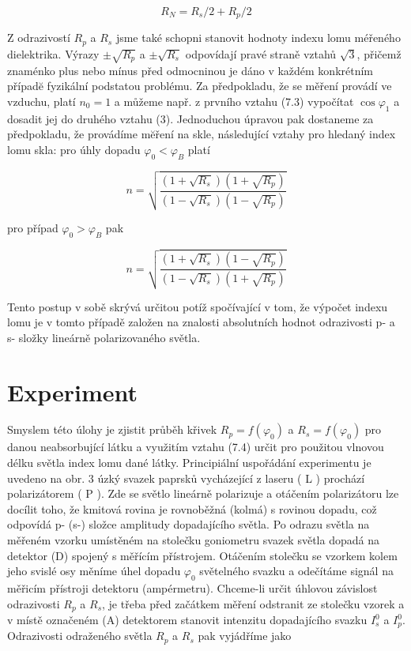 \documentclass[czech,11pt,a4paper]{article}
\begin{document}
\begin{multicols}{2}
		
\begin{equation}
			R_{N}=R_{s} / 2+R_{p} / 2
\end{equation}
		
		
		Z odrazivostí $R_{p}$ a $R_{s}$ jsme také schopni stanovit hodnoty indexu lomu méřeného dielektrika. Výrazy $\pm \sqrt{R_{p}}$ a $\pm \sqrt{R_{s}}$ odpovídají pravé straně vztahů $\sqrt{3}$, přičemž znaménko plus nebo mínus před odmocninou je dáno v každém konkrétním případĕ fyzikální podstatou problému. Za předpokladu, že se měření provádí ve vzduchu, platí $n_{0}=1$ a můžeme např. z prvního vztahu (7.3) vypočítat $\cos \varphi_{1}$ a dosadit jej do druhého vztahu (3). Jednoduchou úpravou pak dostaneme za předpokladu, že provádíme mĕření na skle, následující vztahy pro hledaný index lomu skla: pro úhly dopadu $\varphi_{0}<\varphi_{B}$ platí
		
		
		\begin{equation}
			n=\sqrt{\frac{\left(1+\sqrt{R_{s}}\right)\left(1+\sqrt{R_{p}}\right)}{\left(1-\sqrt{R_{s}}\right)\left(1-\sqrt{R_{p}}\right)}}
		\end{equation}
		
		pro případ $\varphi_{0}>\varphi_{B}$ pak
		
		
		\begin{equation}
			n=\sqrt{\frac{\left(1+\sqrt{R_{s}}\right)\left(1-\sqrt{R_{p}}\right)}{\left(1-\sqrt{R_{s}}\right)\left(1+\sqrt{R_{p}}\right)}}
		\end{equation}
		
		Tento postup v sobě skrývá určitou potíž spočívající v tom, že výpočet indexu lomu je v tomto případě založen na znalosti absolutních hodnot odrazivosti p- a s- složky lineárně polarizovaného světla.
		
		\section{Experiment}
		Smyslem této úlohy je zjistit průběh křivek $R_{p}=f\left(\varphi_{0}\right)$ a $R_{s}=f\left(\varphi_{0}\right)$ pro danou neabsorbující látku a využitím vztahu (7.4) určit pro použitou vlnovou délku světla index lomu dané látky. Principiální uspořádání experimentu je uvedeno na obr. 3 úzký svazek paprsků vycházející z laseru ( L ) prochází polarizátorem ( P ). Zde se světlo lineárně polarizuje a otáčením polarizátoru lze docílit toho, že kmitová rovina je rovnoběžná (kolmá) s rovinou dopadu, což odpovídá p- (s-) složce amplitudy dopadajícího světla. Po odrazu světla na měřeném vzorku umístěném na stolečku goniometru svazek světla dopadá na detektor (D) spojený s měřícím přístrojem. Otáčením stolečku se vzorkem kolem jeho svislé osy měníme úhel dopadu $\varphi_{0}$ světelného svazku a odečítáme signál na měřicím přístroji detektoru (ampérmetru). Chceme-li určit úhlovou závislost odrazivosti $R_{p}$ a $R_{s}$, je třeba před začátkem měření odstranit ze stolečku  vzorek a v místě označeném (A) detektorem stanovit intenzitu dopadajícího svazku $I_{s}^{0}$ a $I_{p}^{0}$. Odrazivosti odraženého světla $R_{p}$ a $R_{s}$ pak vyjádříme jako
		

\end{multicols}
\end{document}
